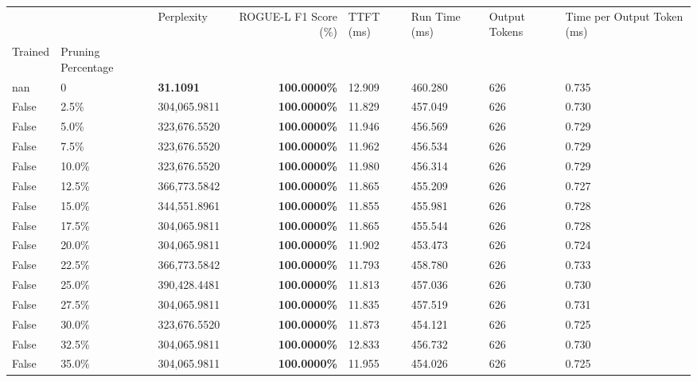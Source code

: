 \begin{table}[H]
\label{tab:evaluation-pipeline-5-untrained}
\begin{tabular}{lllrllll}
\toprule
 &  & Perplexity & ROGUE-L F1 Score (\%) & TTFT (ms) & Run Time (ms) & Output Tokens & Time per Output Token (ms) \\
Trained & Pruning Percentage &  &  &  &  &  &  \\
\midrule
nan & 0 & \bfseries 31.1091 & \bfseries 100.0000\% & 12.909 & 460.280 & 626 & 0.735 \\
\cline{1-8}
False & 2.5\% & \color{red} 304,065.9811 & \bfseries \color{red} 100.0000\% & 11.829 & 457.049 & 626 & 0.730 \\
\cline{1-8}
False & 5.0\% & 323,676.5520 & \bfseries \color{red} 100.0000\% & 11.946 & 456.569 & 626 & 0.729 \\
\cline{1-8}
False & 7.5\% & 323,676.5520 & \bfseries \color{red} 100.0000\% & 11.962 & 456.534 & 626 & 0.729 \\
\cline{1-8}
False & 10.0\% & 323,676.5520 & \bfseries \color{red} 100.0000\% & 11.980 & 456.314 & 626 & 0.729 \\
\cline{1-8}
False & 12.5\% & 366,773.5842 & \bfseries \color{red} 100.0000\% & 11.865 & 455.209 & 626 & 0.727 \\
\cline{1-8}
False & 15.0\% & 344,551.8961 & \bfseries \color{red} 100.0000\% & 11.855 & 455.981 & 626 & 0.728 \\
\cline{1-8}
False & 17.5\% & \color{red} 304,065.9811 & \bfseries \color{red} 100.0000\% & 11.865 & 455.544 & 626 & 0.728 \\
\cline{1-8}
False & 20.0\% & \color{red} 304,065.9811 & \bfseries \color{red} 100.0000\% & 11.902 & 453.473 & 626 & 0.724 \\
\cline{1-8}
False & 22.5\% & 366,773.5842 & \bfseries \color{red} 100.0000\% & 11.793 & 458.780 & 626 & 0.733 \\
\cline{1-8}
False & 25.0\% & 390,428.4481 & \bfseries \color{red} 100.0000\% & 11.813 & 457.036 & 626 & 0.730 \\
\cline{1-8}
False & 27.5\% & \color{red} 304,065.9811 & \bfseries \color{red} 100.0000\% & 11.835 & 457.519 & 626 & 0.731 \\
\cline{1-8}
False & 30.0\% & 323,676.5520 & \bfseries \color{red} 100.0000\% & 11.873 & 454.121 & 626 & 0.725 \\
\cline{1-8}
False & 32.5\% & \color{red} 304,065.9811 & \bfseries \color{red} 100.0000\% & 12.833 & 456.732 & 626 & 0.730 \\
\cline{1-8}
False & 35.0\% & \color{red} 304,065.9811 & \bfseries \color{red} 100.0000\% & 11.955 & 454.026 & 626 & 0.725 \\

\end{tabular}
\end{table}
